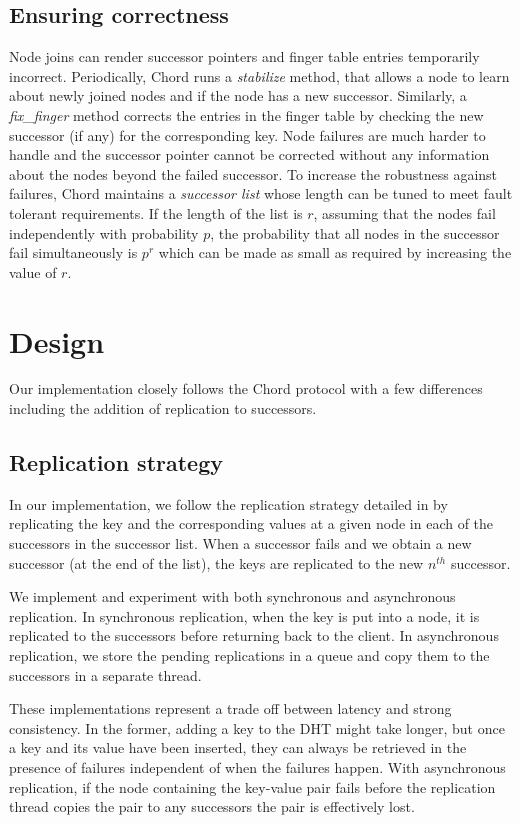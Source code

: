 \documentclass{sig-alternate-10pt}
\begin{document}
\subsection{Ensuring correctness}
Node joins can render successor pointers and finger table entries temporarily incorrect. Periodically, Chord runs a \textit{stabilize} method, that allows a node to learn about newly joined nodes and if the node has a new successor. Similarly, a \textit{fix\_finger} method corrects the entries in the finger table by checking the new successor (if any) for the corresponding key. Node failures are much harder to handle and the successor pointer cannot be corrected without any information about the nodes beyond the failed successor. To increase the robustness against failures, Chord maintains a \textit{successor list} whose length can be tuned to meet fault tolerant requirements. If the length of the list is $r$, assuming that the nodes fail independently with probability $p$, the probability that all nodes in the successor fail simultaneously is $p^r$ which can be made as small as required by increasing the value of $r$.

\section{Design}
Our implementation closely follows the Chord protocol with a few differences including the addition of replication to successors.

\subsection{Replication strategy}
In our implementation, we follow the replication strategy detailed in \cite{dynamo} by replicating the key and the corresponding values at a given node in each of the successors in the successor list. When a successor fails and we obtain a new successor (at the end of the list), the keys are replicated to the new $n^{th}$ successor.

We implement and experiment with both synchronous and asynchronous replication. In synchronous replication, when the key is put into a node, it is replicated to the successors before returning back to the client. In asynchronous replication, we store the pending replications in a queue and copy them to the successors in a separate thread. 

These implementations represent a trade off between latency and strong consistency. In the former, adding a key to the DHT might take longer, but once a key and its value have been inserted, they can always be retrieved in the presence of failures independent of when the failures happen. With asynchronous replication, if the node containing the key-value pair fails before the replication thread copies the pair to any successors the pair is effectively lost.
\end{document}
